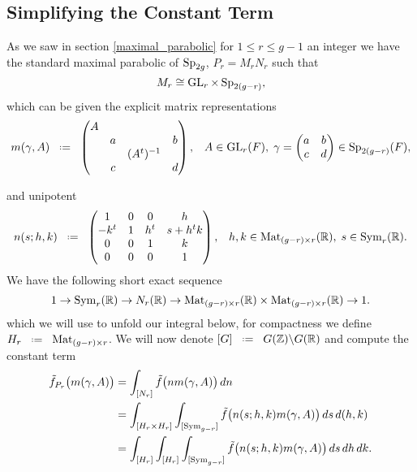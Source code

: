 \subsection{Simplifying the Constant Term}
As we saw in section \ref{maximal_parabolic} for \(1\leq r\leq g-1\) an integer we have the standard maximal parabolic of \(\operatorname{Sp}_{2g}\), \(P_r = M_rN_r\) such that 
\[M_r \cong \operatorname{GL}_r\times \operatorname{Sp}_{2(g-r)},\]
which can be given the explicit matrix representations 
\[m(\gamma, A) \defeq \begin{pmatrix}
	A &&& \\
	&a&&b \\
	&&(A^t)\inv& \\
	&c&&d \\
\end{pmatrix}, \;\;\; A\in \GL_r(F), \; \gamma = \begin{pmatrix}
	a & b\\
	c & d \\
\end{pmatrix} \in \Sp_{2(g-r)}(F), \]

and unipotent 
\[ n(s;h,k) \defeq \begin{pmatrix} 1 & 0 & 0 & h\\ -k^t & 1 & h^t & s+h^t k\\ 0 & 0 & 1 & k\\ 0 & 0 & 0 & 1 \end{pmatrix}, \;\;\; h, k\in\mathrm{Mat}_{(g-r)\times r}(\R),\; s\in\mathrm{Sym}_{r}(\R).\]
We have the following short exact sequence 
\[ 1\to \mathrm{Sym}_{r}(\R)\to N_r(\R)\to \mathrm{Mat}_{(g-r)\times r}(\R)\times\mathrm{Mat}_{(g-r)\times r}(\R) \to 1. \]
which we will use to unfold our integral below, for compactness we define \(H_r \defeq \mathrm{Mat}_{(g-r)\times r}\). We will now denote \([G] \defeq G(\Z)\backslash G(\R)\) and compute the constant term
\begin{align*}
	\tilde f_{P_r}\bigl(m(\gamma, A)\bigr)
	& = \int^{}_{[N_r]}\tilde f\bigl(n m(\gamma, A)\bigr)\,dn \notag\\
	& = \int^{}_{[H_r\times H_r]}\int^{}_{[\mathrm{Sym}_{g-r}]}\tilde f\bigl(n(s; h, k) m(\gamma, A)\bigr)\,ds\,d(h,k) \notag\\
	& = \int^{}_{[H_r]}\int^{}_{[H_r]}\int^{}_{[\mathrm{Sym}_{g-r}]}\tilde f\bigl(n(s; h, k) m(\gamma, A)\bigr)\,ds\,dh\,dk.
\end{align*} 

